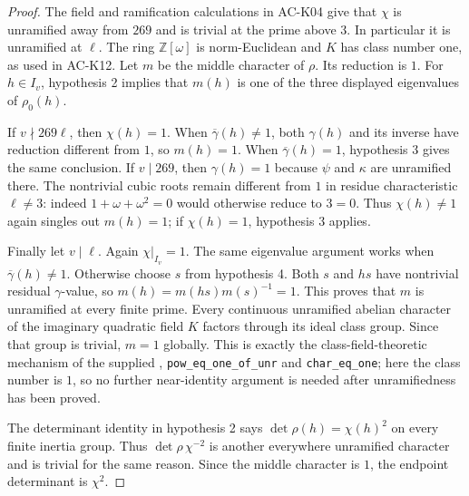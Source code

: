 \begin{proof}
The field and ramification calculations in AC-K04 give that
$\chi$ is unramified away from $269$ and is trivial at the
prime above $3$.  In particular it is unramified at $\ell$.
The ring $\mathbb Z[\omega]$ is norm-Euclidean and $K$ has
class number one, as used in AC-K12.
Let $m$ be the middle character of $\rho$.  Its reduction is $1$.
For $h\in I_v$, hypothesis 2 implies that $m(h)$ is one of
the three displayed eigenvalues of $\rho_0(h)$.

If $v\nmid269\ell$, then $\chi(h)=1$.  When
$\overline\gamma(h)\ne1$, both $\gamma(h)$ and its inverse
have reduction different from $1$, so $m(h)=1$.
When $\overline\gamma(h)=1$, hypothesis 3 gives the same
conclusion.  If $v\mid269$, then $\gamma(h)=1$ because
$\psi$ and $\kappa$ are unramified there.
The nontrivial cubic roots remain different from $1$ in residue
characteristic $\ell\ne3$: indeed $1+\omega+\omega^2=0$
would otherwise reduce to $3=0$.
Thus $\chi(h)\ne1$ again singles out $m(h)=1$; if
$\chi(h)=1$, hypothesis 3 applies.

Finally let $v\mid\ell$.  Again $\chi|_{I_v}=1$.
The same eigenvalue argument works when
$\overline\gamma(h)\ne1$.  Otherwise choose $s$ from
hypothesis 4.  Both $s$ and $hs$ have nontrivial residual
$\gamma$-value, so $m(h)=m(hs)m(s)^{-1}=1$.
This proves that $m$ is unramified at every finite prime.
Every continuous unramified abelian character of the imaginary
quadratic field $K$ factors through its ideal class group.
Since that group is trivial, $m=1$ globally.
This is exactly the class-field-theoretic mechanism of the supplied
,
\texttt{pow\_eq\_one\_of\_unr} and \texttt{char\_eq\_one};
here the class number is $1$, so no further near-identity argument
is needed after unramifiedness has been proved.

The determinant identity in hypothesis 2 says
$\det\rho(h)=\chi(h)^2$ on every finite inertia group.
Thus $\det\rho\,\chi^{-2}$ is another everywhere unramified
character and is trivial for the same reason.  Since the middle
character is $1$, the endpoint determinant is $\chi^2$.
\end{proof}

